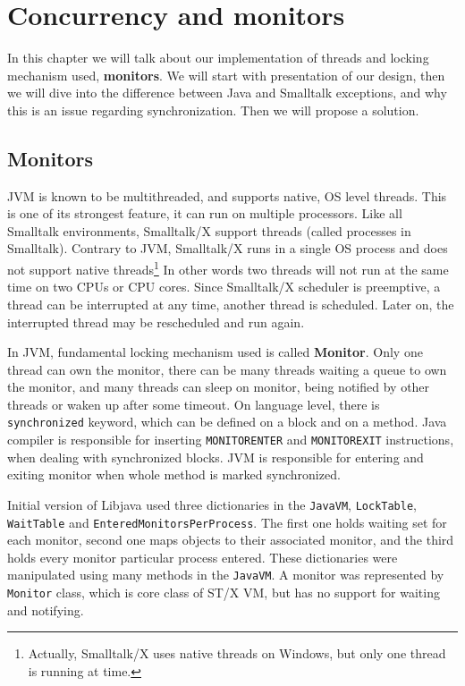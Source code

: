 \documentclass[11pt,twoside,a4paper]{book}
\let\Chapter\chapter
\def\chapter{\addtocontents{lol}{\protect\addvspace{10pt}}\Chapter}
\newcommand{\libjava}{{Libjava}}
\begin{document}
\chapter{Concurrency and monitors}
\label{chap:monitors}

In this chapter we will talk about our implementation of threads and locking mechanism used, \textbf{monitors}. 
We will start with presentation of our design, then we will dive into the difference between Java and Smalltalk exceptions, and why this is an issue regarding synchronization. 
Then we will propose a solution.

\section{Monitors}

JVM is known to be multithreaded, and supports native, OS level threads.
This is one of its strongest feature, it can run on multiple processors.
Like all Smalltalk environments, Smalltalk/X support threads (called processes in Smalltalk). 
Contrary to JVM, Smalltalk/X runs in a single OS process and does not support native threads\footnote{Actually, Smalltalk/X uses native threads on Windows, but only one thread is running at time.}
In other words two threads will not run at the same time on two CPUs or CPU cores. Since Smalltalk/X scheduler is preemptive, a thread can be interrupted at any time, another thread is scheduled. Later on, the interrupted thread may be rescheduled and run again. 

In JVM, fundamental locking mechanism used is called \textbf{Monitor}.
Only one thread can own the monitor, there can be many threads waiting a queue to own the monitor, and many threads can sleep on monitor, being notified by other threads or waken up after some timeout. 
On language level, there is \texttt{synchronized} keyword, which can be defined on a block and on a method. 
Java compiler is responsible for inserting \texttt{MONITORENTER} and \texttt{MONITOREXIT} instructions, when dealing with synchronized 
blocks. JVM is responsible for entering and exiting monitor when whole method is marked synchronized.  

Initial version of \libjava{} used three dictionaries in the \texttt{JavaVM}, \texttt{LockTable}, \texttt{WaitTable} and 
\texttt{EnteredMonitorsPerProcess}.
The first one holds waiting set for each monitor, second one maps objects to their associated monitor, and the third holds 
every monitor particular process entered.
These dictionaries were manipulated using many methods in the \texttt{JavaVM}.
A monitor was represented by \texttt{Monitor} class, which is core class of ST/X VM, but has no support for waiting and notifying.
\end{document}
